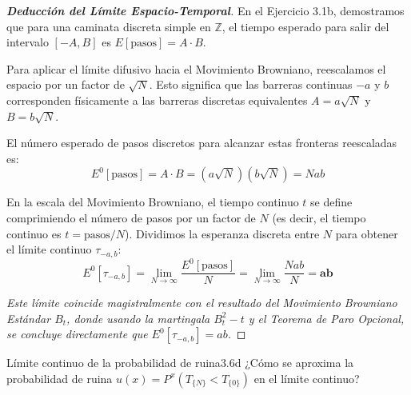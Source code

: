 \documentclass[10pt,a4paper]{article}
\begin{document}
\begin{proof}[\textbf{Deducción del Límite Espacio-Temporal}]
    En el Ejercicio 3.1b, demostramos que para una caminata discreta simple en $\mathbb{Z}$, el tiempo esperado para salir del intervalo $[-A, B]$ es $E[\text{pasos}] = A \cdot B$.

    Para aplicar el límite difusivo hacia el Movimiento Browniano, reescalamos el espacio por un factor de $\sqrt{N}$. Esto significa que las barreras continuas $-a$ y $b$ corresponden físicamente a las barreras discretas equivalentes $A = a\sqrt{N}$ y $B = b\sqrt{N}$.
    
    El número esperado de pasos discretos para alcanzar estas fronteras reescaladas es:
    \[ E^0[\text{pasos}] = A \cdot B = (a\sqrt{N})(b\sqrt{N}) = N a b \]

    En la escala del Movimiento Browniano, el tiempo continuo $t$ se define comprimiendo el número de pasos por un factor de $N$ (es decir, el tiempo continuo es $t = \text{pasos} / N$). 
    Dividimos la esperanza discreta entre $N$ para obtener el límite continuo $\tau_{-a,b}$:
    \[ E^0[\tau_{-a,b}] = \lim_{N \to \infty} \frac{E^0[\text{pasos}]}{N} = \lim_{N \to \infty} \frac{N a b}{N} = \mathbf{a b} \]
    
    \textit{Este límite coincide magistralmente con el resultado del Movimiento Browniano Estándar $B_t$, donde usando la martingala $B_t^2 - t$ y el Teorema de Paro Opcional, se concluye directamente que $E^0[\tau_{-a,b}] = ab$.}
\end{proof}

\newpage

\begin{ejercicio}{Límite continuo de la probabilidad de ruina}{3.6d}
    ¿Cómo se aproxima la probabilidad de ruina $u(x) = P^x(T_{\{N\}} < T_{\{0\}})$ en el límite continuo?
\end{ejercicio}
\end{document}
